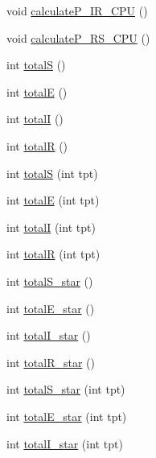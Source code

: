 \begin{DoxyCompactItemize}
\item 
void \hyperlink{classSpatialSEIR_1_1ModelContext_a8a8236ea324fc9e792c5b379020183cb}{calculate\-P\-\_\-\-I\-R\-\_\-\-C\-P\-U} ()
\item 
void \hyperlink{classSpatialSEIR_1_1ModelContext_a1c99b4008dd3fd4035b8b33215103408}{calculate\-P\-\_\-\-R\-S\-\_\-\-C\-P\-U} ()
\item 
int \hyperlink{classSpatialSEIR_1_1ModelContext_a70301e33e229a6186bc6bd1859812966}{total\-S} ()
\item 
int \hyperlink{classSpatialSEIR_1_1ModelContext_a2f98dd4615d8ee7599e40032de50ba04}{total\-E} ()
\item 
int \hyperlink{classSpatialSEIR_1_1ModelContext_ae18307811ef91173a9c8ef59a4eb2f48}{total\-I} ()
\item 
int \hyperlink{classSpatialSEIR_1_1ModelContext_ad6502ed4ce84403c16c06a9fa54eb87a}{total\-R} ()
\item 
int \hyperlink{classSpatialSEIR_1_1ModelContext_ad4f0faeda8cf482cfaa7fee1c750655e}{total\-S} (int tpt)
\item 
int \hyperlink{classSpatialSEIR_1_1ModelContext_a16f31cae10c0043d132d3a5dde6536a6}{total\-E} (int tpt)
\item 
int \hyperlink{classSpatialSEIR_1_1ModelContext_af4bd57033a8a2c0138b2e0ab37722aef}{total\-I} (int tpt)
\item 
int \hyperlink{classSpatialSEIR_1_1ModelContext_a6ecac3d61faa0940c0c2c1813a0be2ac}{total\-R} (int tpt)
\item 
int \hyperlink{classSpatialSEIR_1_1ModelContext_a69035a68a9f37a34745cba86d0259fb7}{total\-S\-\_\-star} ()
\item 
int \hyperlink{classSpatialSEIR_1_1ModelContext_a536c46cb2c5ab9c746b6fbbb74fa806b}{total\-E\-\_\-star} ()
\item 
int \hyperlink{classSpatialSEIR_1_1ModelContext_a6a3a7e1b08d7aaef7261e6cc7c8481d4}{total\-I\-\_\-star} ()
\item 
int \hyperlink{classSpatialSEIR_1_1ModelContext_a9d6176568883661bcd259c7d8d7e5531}{total\-R\-\_\-star} ()
\item 
int \hyperlink{classSpatialSEIR_1_1ModelContext_aa85a5be6616c189722605624e9e5db94}{total\-S\-\_\-star} (int tpt)
\item 
int \hyperlink{classSpatialSEIR_1_1ModelContext_a1578d2c71f5a77617e254ead442971a3}{total\-E\-\_\-star} (int tpt)
\item 
int \hyperlink{classSpatialSEIR_1_1ModelContext_a50f72f64c8ad978f5b740af4efbdf113}{total\-I\-\_\-star} (int tpt)

\end{DoxyCompactItemize}
